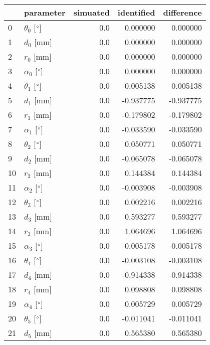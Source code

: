 \documentclass{standalone}%
\begin{document}
%
\normalsize%
\begin{tabular}{llrrr}
\toprule
{} &                 parameter & simuated & identified & difference \\
\midrule
0  &  $\theta_{0}$ [$\degree$] &      0.0 &   0.000000 &   0.000000 \\
1  &              $d_{0}$ [mm] &      0.0 &   0.000000 &   0.000000 \\
2  &              $r_{0}$ [mm] &      0.0 &   0.000000 &   0.000000 \\
3  &  $\alpha_{0}$ [$\degree$] &      0.0 &   0.000000 &   0.000000 \\
4  &  $\theta_{1}$ [$\degree$] &      0.0 &  -0.005138 &  -0.005138 \\
5  &              $d_{1}$ [mm] &      0.0 &  -0.937775 &  -0.937775 \\
6  &              $r_{1}$ [mm] &      0.0 &  -0.179802 &  -0.179802 \\
7  &  $\alpha_{1}$ [$\degree$] &      0.0 &  -0.033590 &  -0.033590 \\
8  &  $\theta_{2}$ [$\degree$] &      0.0 &   0.050771 &   0.050771 \\
9  &              $d_{2}$ [mm] &      0.0 &  -0.065078 &  -0.065078 \\
10 &              $r_{2}$ [mm] &      0.0 &   0.144384 &   0.144384 \\
11 &  $\alpha_{2}$ [$\degree$] &      0.0 &  -0.003908 &  -0.003908 \\
12 &  $\theta_{3}$ [$\degree$] &      0.0 &   0.002216 &   0.002216 \\
13 &              $d_{3}$ [mm] &      0.0 &   0.593277 &   0.593277 \\
14 &              $r_{3}$ [mm] &      0.0 &   1.064696 &   1.064696 \\
15 &  $\alpha_{3}$ [$\degree$] &      0.0 &  -0.005178 &  -0.005178 \\
16 &  $\theta_{4}$ [$\degree$] &      0.0 &  -0.003108 &  -0.003108 \\
17 &              $d_{4}$ [mm] &      0.0 &  -0.914338 &  -0.914338 \\
18 &              $r_{4}$ [mm] &      0.0 &   0.098808 &   0.098808 \\
19 &  $\alpha_{4}$ [$\degree$] &      0.0 &   0.005729 &   0.005729 \\
20 &  $\theta_{5}$ [$\degree$] &      0.0 &  -0.011041 &  -0.011041 \\
21 &              $d_{5}$ [mm] &      0.0 &   0.565380 &   0.565380 \\

\end{tabular}
\end{document}
